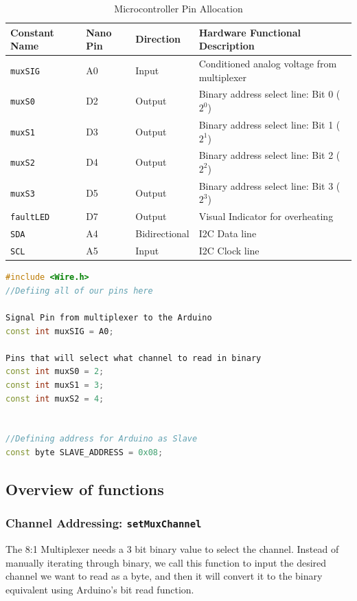 \documentclass{article}
\begin{document}
\begin{table}[H]
\centering
\caption{Microcontroller Pin Allocation}
\label{tab:pinout}
\begin{tabular}{llll}
\toprule
\textbf{Constant Name} & \textbf{Nano Pin} & \textbf{Direction} & \textbf{Hardware Functional Description} \\
\midrule
\lstinline|muxSIG|   & A0 & Input  & Conditioned analog voltage from multiplexer \\
\lstinline|muxS0|    & D2 & Output & Binary address select line: Bit 0 ($2^0$) \\
\lstinline|muxS1|    & D3 & Output & Binary address select line: Bit 1 ($2^1$) \\
\lstinline|muxS2|    & D4 & Output & Binary address select line: Bit 2 ($2^2$) \\
\lstinline|muxS3|    & D5 & Output & Binary address select line: Bit 3 ($2^3$) \\
\lstinline|faultLED| & D7 & Output & Visual Indicator for overheating\\
\lstinline|SDA|      & A4 & Bidirectional & I2C Data line  \\
\lstinline|SCL|      & A5 & Input  & I2C Clock line \\
\bottomrule
\end{tabular}
\end{table}

\begin{lstlisting}[language=C++, caption={Pin definitions}, label={lst:pin_defs}]
#include <Wire.h>
//Defiing all of our pins here 

Signal Pin from multiplexer to the Arduino
const int muxSIG = A0; 

Pins that will select what channel to read in binary
const int muxS0 = 2;
const int muxS1 = 3;
const int muxS2 = 4;

  
//Defining address for Arduino as Slave
const byte SLAVE_ADDRESS = 0x08;

\end{lstlisting}

\subsection{Overview of functions}

\subsubsection{Channel Addressing: \lstinline|setMuxChannel|}
The 8:1 Multiplexer needs a 3 bit binary value to select the channel. Instead of manually iterating through binary, we call this function to input the desired channel we want to read as a byte, and then it will convert it to the binary equivalent using Arduino's bit read function.
\end{document}
